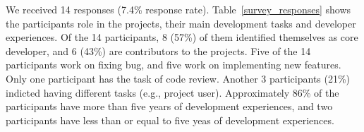 We received 14 responses (7.4\% response rate). Table~\ref{survey_responses} shows the participants role in the projects, their main development tasks and developer experiences. Of the 14 participants, 8 (57\%) of them identified themselves as core developer, and 6 (43\%) are contributors to the projects. Five of the 14 participants work on fixing bug, and five work on implementing new features. Only one participant has the task of code review. Another 3 participants (21\%) indicted having different tasks (e.g., project user). Approximately 86\% of the participants have more than five years of development experiences, and two participants have less than or equal to five yeas of development experiences.





